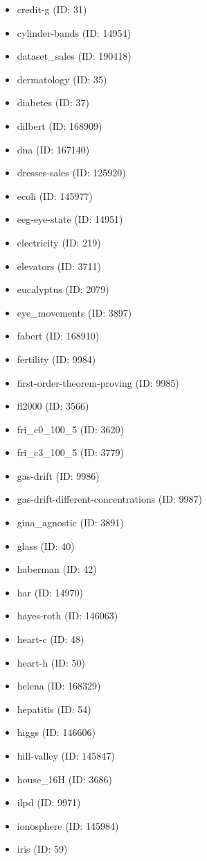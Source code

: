 \begin{itemize}
  \item credit-g (ID: 31)
  \item cylinder-bands (ID: 14954)
  \item dataset\_sales (ID: 190418)
  \item dermatology (ID: 35)
  \item diabetes (ID: 37)
  \item dilbert (ID: 168909)
  \item dna (ID: 167140)
  \item dresses-sales (ID: 125920)
  \item ecoli (ID: 145977)
  \item eeg-eye-state (ID: 14951)
  \item electricity (ID: 219)
  \item elevators (ID: 3711)
  \item eucalyptus (ID: 2079)
  \item eye\_movements (ID: 3897)
  \item fabert (ID: 168910)
  \item fertility (ID: 9984)
  \item first-order-theorem-proving (ID: 9985)
  \item fl2000 (ID: 3566)
  \item fri\_c0\_100\_5 (ID: 3620)
  \item fri\_c3\_100\_5 (ID: 3779)
  \item gas-drift (ID: 9986)
  \item gas-drift-different-concentrations (ID: 9987)
  \item gina\_agnostic (ID: 3891)
  \item glass (ID: 40)
  \item haberman (ID: 42)
  \item har (ID: 14970)
  \item hayes-roth (ID: 146063)
  \item heart-c (ID: 48)
  \item heart-h (ID: 50)
  \item helena (ID: 168329)
  \item hepatitis (ID: 54)
  \item higgs (ID: 146606)
  \item hill-valley (ID: 145847)
  \item house\_16H (ID: 3686)
  \item ilpd (ID: 9971)
  \item ionosphere (ID: 145984)
  \item iris (ID: 59)

\end{itemize}
